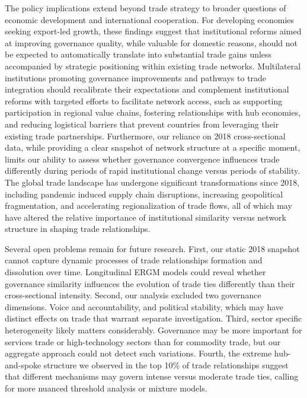 \documentclass[
]{article}
\begin{document}
The policy implications extend beyond trade strategy to broader
questions of economic development and international cooperation. For
developing economies seeking export-led growth, these findings suggest
that institutional reforms aimed at improving governance quality, while
valuable for domestic reasons, should not be expected to automatically
translate into substantial trade gains unless accompanied by strategic
positioning within existing trade networks. Multilateral institutions
promoting governance improvements and pathways to trade integration
should recalibrate their expectations and complement institutional
reforms with targeted efforts to facilitate network access, such as
supporting participation in regional value chains, fostering
relationships with hub economies, and reducing logistical barriers that
prevent countries from leveraging their existing trade partnerships.
Furthermore, our reliance on 2018 cross-sectional data, while providing
a clear snapshot of network structure at a specific moment, limits our
ability to assess whether governance convergence influences trade
differently during periods of rapid institutional change versus periods
of stability. The global trade landscape has undergone significant
transformations since 2018, including pandemic induced supply chain
disruptions, increasing geopolitical fragmentation, and accelerating
regionalization of trade flows, all of which may have altered the
relative importance of institutional similarity versus network structure
in shaping trade relationships.

Several open problems remain for future research. First, our static 2018
snapshot cannot capture dynamic processes of trade relationships
formation and dissolution over time. Longitudinal ERGM models could
reveal whether governance similarity influences the evolution of trade
ties differently than their cross-sectional intensity. Second, our
analysis excluded two governance dimensions. Voice and accountability,
and political stability, which may have distinct effects on trade that
warrant separate investigation. Third, sector specific heterogeneity
likely matters considerably. Governance may be more important for
services trade or high-technology sectors than for commodity trade, but
our aggregate approach could not detect such variations. Fourth, the
extreme hub-and-spoke structure we observed in the top 10\% of trade
relationships suggest that different mechanisms may govern intense
versus moderate trade ties, calling for more nuanced threshold analysis
or mixture models.
\end{document}
